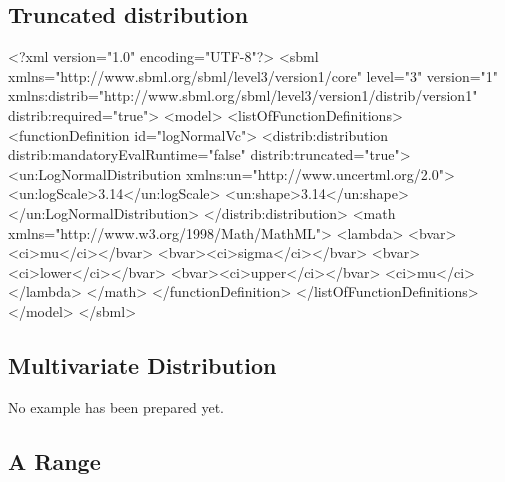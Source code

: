 \documentclass[draftspec]{sbmlpkgspec}
\begin{document}
\subsection{Truncated distribution}
\label{sec: truncated-eg}

\begin{example}
<?xml version="1.0" encoding="UTF-8"?>
<sbml xmlns="http://www.sbml.org/sbml/level3/version1/core" level="3" version="1"
      xmlns:distrib="http://www.sbml.org/sbml/level3/version1/distrib/version1" 
      distrib:required="true">
    <model>
        <listOfFunctionDefinitions>
            <functionDefinition id="logNormalVc">
                <distrib:distribution distrib:mandatoryEvalRuntime="false" distrib:truncated="true">
                    <un:LogNormalDistribution xmlns:un="http://www.uncertml.org/2.0">
                        <un:logScale>3.14</un:logScale>
                        <un:shape>3.14</un:shape>
                    </un:LogNormalDistribution>
                </distrib:distribution>
                <math xmlns="http://www.w3.org/1998/Math/MathML">
                    <lambda>
                        <bvar><ci>mu</ci></bvar>
                        <bvar><ci>sigma</ci></bvar>
                        <bvar><ci>lower</ci></bvar>
                        <bvar><ci>upper</ci></bvar> 
                        <ci>mu</ci>                         
                    </lambda>
                </math>
            </functionDefinition>
            </listOfFunctionDefinitions>
    </model>
</sbml>
\end{example}

\subsection{Multivariate Distribution}

No example has been prepared yet.

\subsection{A Range}
\end{document}

